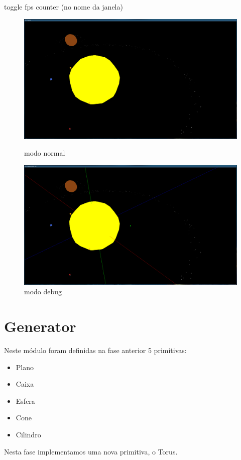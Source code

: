 \documentclass[a4paper]{report}
\begin{document}
\begin{itemize}
        \subitem toggle fps counter (no nome da janela)
        \begin{figure}[H]
            \centering
            \begin{minipage}{0.49\textwidth}
                \centering
                \includegraphics[width=\textwidth]{images/normal_mode.png}
                \caption{modo normal}
            \end{minipage}\hfill
            \begin{minipage}{0.49\textwidth}
                \centering
                \includegraphics[width=\textwidth]{images/debug_mode.png}
                \caption{modo debug}
            \end{minipage}
        \end{figure}
\end{itemize}

\chapter{Generator}
Neste módulo foram definidas na fase anterior 5 primitivas:
\begin{itemize}
        \item Plano
        \item Caixa
        \item Esfera
        \item Cone
        \item Cilindro
\end{itemize}
Nesta fase implementamos uma nova primitiva, o Torus.\\
\end{document}

